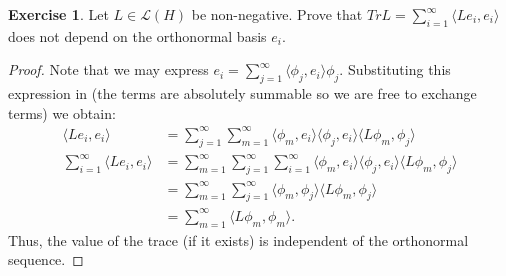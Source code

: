 \documentclass{amsart}
\theoremstyle{plain}
\theoremstyle{definition}
\newtheorem{exer}{Exercise}[section]
\begin{document}
\begin{exer}
    Let $L\in \mathcal{L}(H)$ be non-negative. Prove that $Tr L = \sum_{i=1}^{\infty} \langle Le_i, e_i\rangle$ does not depend on the orthonormal basis $e_i.$
\end{exer}
\begin{proof}
    Note that we may express $e_i = \sum_{j=1}^\infty \langle \phi_j,e_i\rangle \phi_j. $
    Substituting this expression in (the terms are absolutely summable so we are free to exchange terms) we obtain:
    \begin{align*}
        \langle L e_i ,e_i\rangle &= \sum_{j=1}^{\infty} \sum_{m=1}^{\infty} \langle \phi_m,e_i\rangle\langle \phi_j, e_i\rangle \langle L\phi_m, \phi_j\rangle\\
        \sum_{i=1}^\infty  \langle L e_i ,e_i\rangle &=\sum_{m=1}^\infty \sum_{j=1}^\infty \sum_{i=1}^{\infty} \langle \phi_m,e_i\rangle\langle \phi_j, e_i\rangle \langle L\phi_m, \phi_j\rangle\\
        &= \sum_{m=1}^{\infty} \sum_{j=1}^\infty \langle \phi_m, \phi_j\rangle \langle L\phi_m, \phi_j \rangle\\
        &= \sum_{m=1}^\infty \langle L\phi_m, \phi_m \rangle.
    \end{align*}
Thus, the value of the trace (if it exists) is independent of the orthonormal sequence. 
\end{proof}
\end{document}
